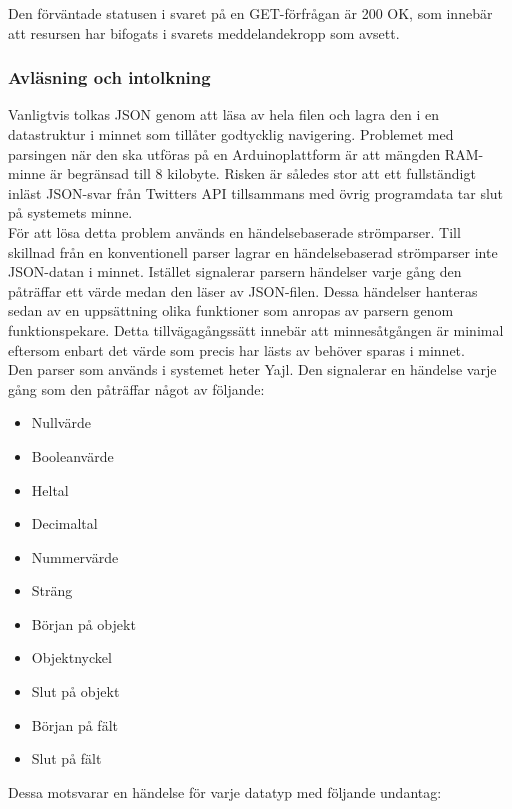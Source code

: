 \documentclass[a4paper,11pt]{article}
\begin{document}
Den förväntade statusen i svaret på en GET-förfrågan är 200 OK, som innebär att resursen har bifogats i svarets meddelandekropp som avsett. \\

\subsubsection{Avläsning och intolkning}
Vanligtvis tolkas JSON genom att läsa av hela filen och lagra den i en datastruktur i minnet som tillåter godtycklig navigering. Problemet med parsingen när den ska utföras på en Arduinoplattform är att mängden RAM-minne är begränsad till 8 kilobyte. Risken är således stor att ett fullständigt inläst JSON-svar från Twitters API tillsammans med övrig programdata tar slut på systemets minne. \\

För att lösa detta problem används en händelsebaserade strömparser. Till skillnad från en konventionell parser lagrar en händelsebaserad strömparser inte JSON-datan i minnet. Istället signalerar parsern händelser varje gång den påträffar ett värde medan den läser av JSON-filen. Dessa händelser hanteras sedan av en uppsättning olika funktioner som anropas av parsern genom funktionspekare. Detta tillvägagångssätt innebär att minnesåtgången är minimal eftersom enbart det värde som precis har lästs av behöver sparas i minnet. \\

Den parser som används i systemet heter Yajl. Den signalerar en händelse varje gång som den påträffar något av följande:

	\begin{itemize}
    	\item Nullvärde
    	\item Booleanvärde
    	\item Heltal
    	\item Decimaltal
    	\item Nummervärde
    	\item Sträng
    	\item Början på objekt
    	\item Objektnyckel
    	\item Slut på objekt
    	\item Början på fält
    	\item Slut på fält
	\end{itemize}
	
Dessa motsvarar en händelse för varje datatyp med följande undantag:
\end{document}
